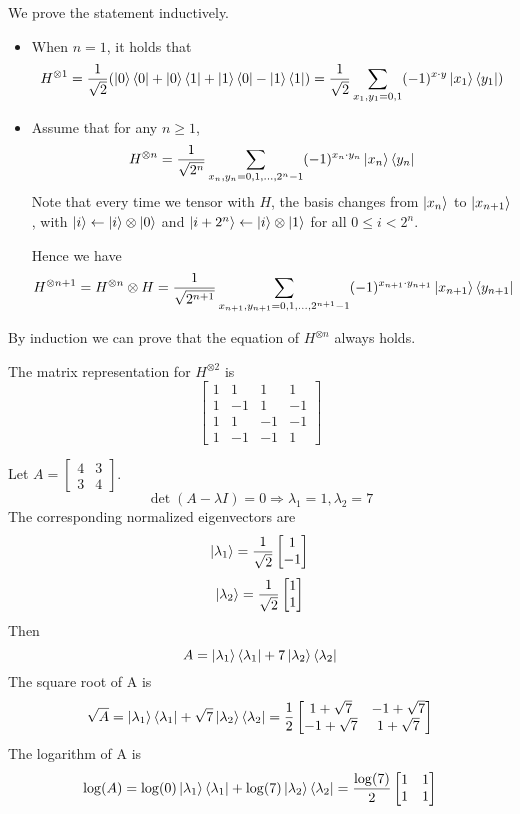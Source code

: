 \documentclass{homeworg}
\begin{document}
\exercise*
We prove the statement inductively.
\begin{itemize}
    \item When $n=1$, it holds that
    \[H^{\otimes 1}=\frac{1}{\sqrt{2}}(\ket{0}\bra{0}+\ket{0}\bra{1}+\ket{1}\bra{0}-\ket{1}\bra{1})=\frac{1}{\sqrt{2}}\sum_{x_1,y_1=0,1}(-1)^{x\cdot y}\ket{x_1}\bra{y_1})\]
    \item Assume that for any $n\geq 1$, 
    \[H^{\otimes n}=\frac{1}{\sqrt{2^n}}\sum_{x_n,y_n=0,1,\dots, 2^n -1}(-1)^{x_n\cdot y_n}\ket{x_n}\bra{y_n}\]
    Note that every time we tensor with $H$, the basis changes from $\ket{x_n}$ to $\ket{x_{n+1}}$, with $\ket{i}\leftarrow\ket{i}\otimes\ket{0}$ and $\ket{i+2^n}\leftarrow\ket{i}\otimes\ket{1}$ for all $0\leq i< 2^n$.
    
    Hence we have
    \[H^{\otimes n+1}=H^{\otimes n}\otimes H=\frac{1}{\sqrt{2^{n+1}}}\sum_{x_{n+1},y_{n+1}=0,1,\dots,2^{n+1}-1}(-1)^{x_{n+1}\cdot y_{n+1}}\ket{x_{n+1}}\bra{y_{n+1}}\]
\end{itemize}

By induction we can prove that the equation of $H^{\otimes n}$ always holds.

The matrix representation for $H^{\otimes 2}$ is
\[\begin{bmatrix}
1 & 1 & 1 & 1 \\
1 & -1 & 1 & -1 \\
1 & 1 & -1 & -1 \\
1 & -1 & -1 & 1\end{bmatrix}\]

\exercise*
Let $A=\begin{bmatrix}
4 & 3\\
3 & 4\end{bmatrix}$.
\[\det(A-\lambda I)=0\Rightarrow\lambda_1=1,\lambda_2=7\]
The corresponding normalized eigenvectors are
\[\ket{\lambda_1}=\frac{1}{\sqrt{2}}\begin{bmatrix}
1\\
-1\end{bmatrix}\]
\[\ket{\lambda_2}=\frac{1}{\sqrt{2}}\begin{bmatrix}
1\\
1\end{bmatrix}\]
Then
\[A=\ket{\lambda_1}\bra{\lambda_1}+7\ket{\lambda_2}\bra{\lambda_2}\]
The square root of A is
\[\sqrt{A}=\ket{\lambda_1}\bra{\lambda_1}+\sqrt{7}\ket{\lambda_2}\bra{\lambda_2}=\frac{1}{2}\begin{bmatrix}
1+\sqrt{7} & -1+\sqrt{7}\\
-1+\sqrt{7} & 1+\sqrt{7}\end{bmatrix}\]
The logarithm of A is
\[\log(A)=\log(0)\ket{\lambda_1}\bra{\lambda_1}+\log(7)\ket{\lambda_2}\bra{\lambda_2}=\frac{\log(7)}{2}\begin{bmatrix}
1 & 1\\
1 & 1\end{bmatrix}\]
\end{document}
